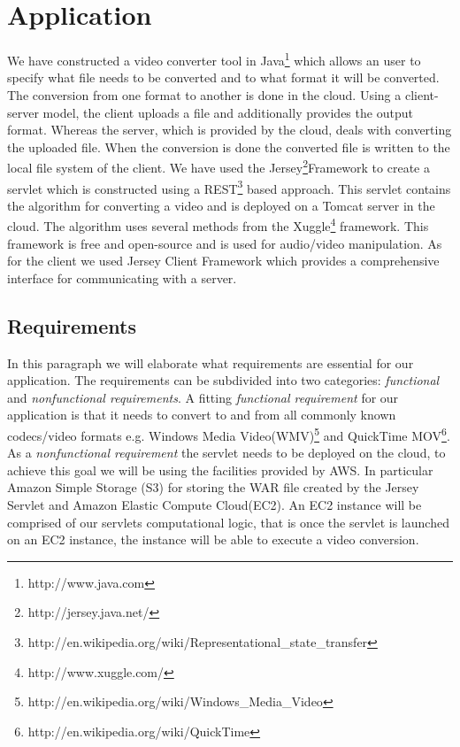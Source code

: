 \section{Application}
\label{sec:appl}
We have constructed a video converter tool in Java\footnote{http://www.java.com} which allows an user to specify what file needs to be converted and to what format it will be converted. 
The conversion from one format to another is done in the cloud. 
Using a client-server model, the client uploads  a file and additionally provides the output format. 
Whereas the server, which is provided by the cloud, deals with converting the uploaded file. 
When the conversion is done the converted file is written to the local file system of the client. 
We have used the Jersey\footnote{http://jersey.java.net/}Framework to create a servlet which is constructed using a REST\footnote{http://en.wikipedia.org/wiki/Representational\_state\_transfer} based approach. 
This servlet contains the algorithm for converting a video and is deployed on a Tomcat server in the cloud. 
The algorithm uses several methods from the Xuggle\footnote{http://www.xuggle.com/} framework. 
This framework  is  free and open-source and is used for audio/video manipulation. 
As for the client we used Jersey Client Framework which provides a comprehensive interface for communicating with a server.
\pagebreak[1]  
\subsection{Requirements}
In this paragraph we will elaborate what requirements are essential for our application. 
The requirements can be subdivided into two categories: \emph{functional} and \emph{nonfunctional requirements}. 
A fitting \emph{functional requirement} for our application is that it needs to convert to and from  all commonly known codecs/video formats 
e.g. Windows Media Video(WMV)\footnote{http://en.wikipedia.org/wiki/Windows\_Media\_Video} 
and QuickTime MOV\footnote{http://en.wikipedia.org/wiki/QuickTime}.  
As a \emph{nonfunctional requirement} the servlet needs to be deployed on the cloud, to achieve this goal we will be using the facilities provided by AWS. 
In particular Amazon  Simple Storage (S3) for storing the WAR file created by the Jersey Servlet and Amazon Elastic Compute Cloud(EC2). 
An EC2 instance will be comprised of our servlets computational logic, that is once the servlet is launched on an EC2 instance, the instance will be able to execute a video conversion.
 
